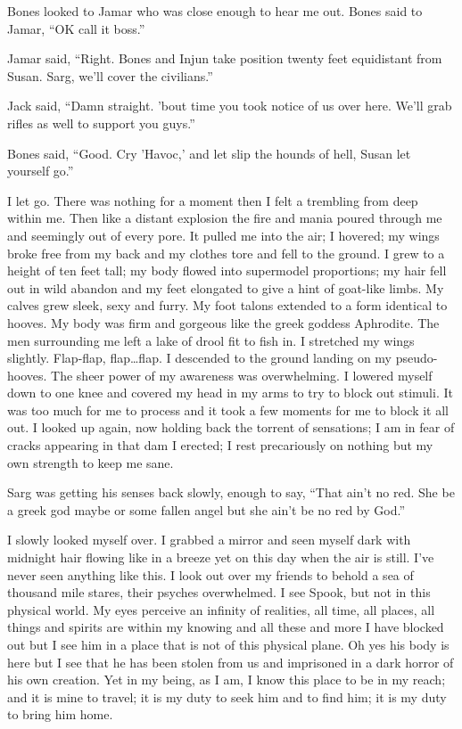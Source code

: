 Bones looked to Jamar who was close enough to hear me out. Bones said to Jamar, ``OK call it boss.''

Jamar said, ``Right. Bones and Injun take position twenty feet equidistant from Susan. Sarg, we'll cover the civilians.''

Jack said, ``Damn straight. 'bout time you took notice of us over here. We'll grab rifles as well to support you guys.''

Bones said, ``Good. Cry 'Havoc,' and let slip the hounds of hell, Susan let yourself go.''


\parasep

I let go. There was nothing for a moment then I felt a trembling from deep within me. Then like a distant explosion the fire and mania poured through me and seemingly out of every pore. It pulled me into the air; I hovered; my wings broke free from my back and my clothes tore and fell to the ground. I grew to a height of ten feet tall; my body flowed into supermodel proportions; my hair fell out in wild abandon and my feet elongated to give a hint of goat-like limbs. My calves grew sleek, sexy and furry. My foot talons extended to a form identical to hooves. My body was firm and gorgeous like the greek goddess Aphrodite. The men surrounding me left a lake of drool fit to fish in. I stretched my wings slightly. Flap-flap, flap\dots flap. I descended to the ground landing on my pseudo-hooves. The sheer power of my awareness was overwhelming. I lowered myself down to one knee and covered my head in my arms to try to block out stimuli. It was too much for me to process and it took a few moments for me to block it all out. I looked up again, now holding back the torrent of sensations; I am in fear of cracks appearing in that dam I erected; I rest precariously on nothing but my own strength to keep me sane.

Sarg was getting his senses back slowly, enough to say, ``That ain't no red. She be a greek god maybe or some fallen angel but she ain't be no red by God.''

I slowly looked myself over. I grabbed a mirror and seen myself dark with midnight hair flowing like in a breeze yet on this day when the air is still. I've never seen anything like this. I look out over my friends to behold a sea of thousand mile stares, their psyches overwhelmed. I see Spook, but not in this physical world. My eyes perceive an infinity of realities, all time, all places, all things and spirits are within my knowing and all these and more I have blocked out but I see him in a place that is not of this physical plane. Oh yes his body is here but I see that he has been stolen from us and imprisoned in a dark horror of his own creation. Yet in my being, as I am, I know this place to be in my reach; and it is mine to travel; it is my duty to seek him and to find him; it is my duty to bring him home.

